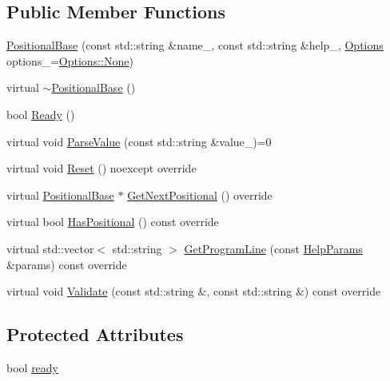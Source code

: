 \subsection*{Public Member Functions}
\begin{DoxyCompactItemize}
\item 
\hyperlink{classargs_1_1_positional_base_a767aa51d8d20a299cd369838818d82ab}{Positional\+Base} (const std\+::string \&name\+\_\+, const std\+::string \&help\+\_\+, \hyperlink{namespaceargs_aa530c0f95194aa275f49a5f299ac9e77}{Options} options\+\_\+=\hyperlink{namespaceargs_aa530c0f95194aa275f49a5f299ac9e77a6adf97f83acf6453d4a6a4b1070f3754}{Options\+::\+None})
\item 
virtual \hyperlink{classargs_1_1_positional_base_ae6f5c9ced2da31d6818a6cfb472a063a}{$\sim$\+Positional\+Base} ()
\item 
bool \hyperlink{classargs_1_1_positional_base_a196ab167914517cb9f97b731c3471c19}{Ready} ()
\item 
virtual void \hyperlink{classargs_1_1_positional_base_a10b6b91155f56bc28ca25fa87c6f0985}{Parse\+Value} (const std\+::string \&value\+\_\+)=0
\item 
virtual void \hyperlink{classargs_1_1_positional_base_a14edfb214858983cf5116c8d0fec72ea}{Reset} () noexcept override
\item 
virtual \hyperlink{classargs_1_1_positional_base}{Positional\+Base} $\ast$ \hyperlink{classargs_1_1_positional_base_aaaf09006fd551306b979ea026c49bddb}{Get\+Next\+Positional} () override
\item 
virtual bool \hyperlink{classargs_1_1_positional_base_ad730bb355966fa423046bef31015fbc3}{Has\+Positional} () const override
\item 
virtual std\+::vector$<$ std\+::string $>$ \hyperlink{classargs_1_1_positional_base_a5bf0bc66f4b8cc5aa414fe8976ab8129}{Get\+Program\+Line} (const \hyperlink{structargs_1_1_help_params}{Help\+Params} \&params) const override
\item 
virtual void \hyperlink{classargs_1_1_positional_base_ae328a7b091e6a409df34309a2fb44a71}{Validate} (const std\+::string \&, const std\+::string \&) const override
\end{DoxyCompactItemize}
\subsection*{Protected Attributes}
\begin{DoxyCompactItemize}
\item 
bool \hyperlink{classargs_1_1_positional_base_a3c1226976201c0c62cbd63c5da0a401e}{ready}
\end{DoxyCompactItemize}
